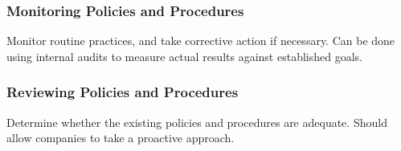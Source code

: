 \documentclass[\main/notes.tex]{subfiles}
\begin{document}
				\subsubsection{Monitoring Policies and Procedures}
					Monitor routine practices, and take corrective action if necessary. Can be done using internal audits to measure actual results against established goals.
				\subsubsection{Reviewing Policies and Procedures}
					Determine whether the existing policies and procedures are adequate. Should allow companies to take a proactive approach.

	\vbox{}
\end{document}
